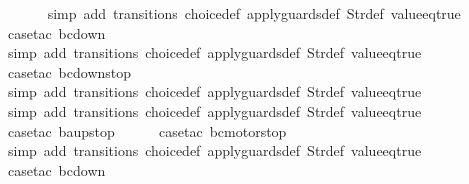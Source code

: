 \begin{isabellebody}
\ \ \ \ \ \isamarkupfalse%
\ {\isacharparenleft}simp\ add{\isacharcolon}\ transitions\ choice{\isacharunderscore}def\ apply{\isacharunderscore}guards{\isacharunderscore}def\ Str{\isacharunderscore}def\ value{\isacharunderscore}eq{\isacharunderscore}true{\isacharparenright}\isanewline
\ \ \ \ \isamarkupfalse%
\ {\isacharparenleft}case{\isacharunderscore}tac\ {\isachardoublequoteopen}bc{\isacharequal}down{}{}{\isachardoublequoteclose}{\isacharparenright}\isanewline
\ \ \ \ \ \isamarkupfalse%
\ {\isacharparenleft}simp\ add{\isacharcolon}\ transitions\ choice{\isacharunderscore}def\ apply{\isacharunderscore}guards{\isacharunderscore}def\ Str{\isacharunderscore}def\ value{\isacharunderscore}eq{\isacharunderscore}true{\isacharparenright}\isanewline
\ \ \ \ \isamarkupfalse%
\ {\isacharparenleft}case{\isacharunderscore}tac\ {\isachardoublequoteopen}bc{\isacharequal}down{}{}stop{\isachardoublequoteclose}{\isacharparenright}\isanewline
\ \ \ \ \ \isamarkupfalse%
\ {\isacharparenleft}simp\ add{\isacharcolon}\ transitions\ choice{\isacharunderscore}def\ apply{\isacharunderscore}guards{\isacharunderscore}def\ Str{\isacharunderscore}def\ value{\isacharunderscore}eq{\isacharunderscore}true{\isacharparenright}\isanewline
\ \ \ \ \isamarkupfalse%
\ {\isacharparenleft}simp\ add{\isacharcolon}\ transitions\ choice{\isacharunderscore}def\ apply{\isacharunderscore}guards{\isacharunderscore}def\ Str{\isacharunderscore}def\ value{\isacharunderscore}eq{\isacharunderscore}true{\isacharparenright}\isanewline
\ \isamarkupfalse%
\ {\isacharparenleft}case{\isacharunderscore}tac\ {\isachardoublequoteopen}ba{\isacharequal}up{}{}stop{\isachardoublequoteclose}{\isacharparenright}\isanewline
\ \ \ \ \isamarkupfalse%
\ {\isacharparenleft}case{\isacharunderscore}tac\ {\isachardoublequoteopen}bc{\isacharequal}motorstop{}{\isachardoublequoteclose}{\isacharparenright}\isanewline
\ \ \ \ \ \isamarkupfalse%
\ {\isacharparenleft}simp\ add{\isacharcolon}\ transitions\ choice{\isacharunderscore}def\ apply{\isacharunderscore}guards{\isacharunderscore}def\ Str{\isacharunderscore}def\ value{\isacharunderscore}eq{\isacharunderscore}true{\isacharparenright}\isanewline
\ \ \ \ \isamarkupfalse%
\ {\isacharparenleft}case{\isacharunderscore}tac\ {\isachardoublequoteopen}bc{\isacharequal}down{}{}{\isachardoublequoteclose}{\isacharparenright}\isanewline

\end{isabellebody}
